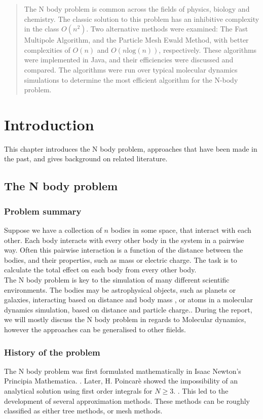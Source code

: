 \documentclass[pdftex,twoside,a4paper]{report}
\begin{document}
\begin{abstract}
The N body problem is common across the fields of physics, biology and chemistry. The classic solution to this problem has an inhibitive complexity in the class $O(n^2)$. Two alternative methods were examined: The Fast Multipole Algorithm, and the Particle Mesh Ewald Method, with better complexities of $O(n)$ and $O(n \text{log}(n))$, respectively. These algorithms were implemented in Java, and their efficiencies were discussed and compared. The algorithms were run over typical molecular dynamics simulations to determine the most efficient algorithm for the N-body problem.
\end{abstract}

\tableofcontents

\chapter{Introduction}
This chapter introduces the N body problem, approaches that have been made in the past, and gives background on related literature.
\section{The N body problem}
    \subsection{Problem summary}
    Suppose we have a collection of $n$ bodies in some space, that interact with each other. Each body interacts with every other body in the system in a pairwise way. Often this pairwise interaction is a function of the distance between the bodies, and their properties, such as mass or electric charge. The task is to calculate the total effect on each body from every other body.\\
    
    The N body problem is key to the simulation of many different scientific environments. The bodies may be astrophysical objects, such as planets or galaxies, interacting based on distance and body mass \cite{MilleniumRun}, or atoms in a molecular dynamics simulation, based on distance and particle charge.\cite{NAMD}. During the report, we will mostly discuss the N body problem in regards to Molecular dynamics, however the approaches can be generalised to other fiields.
    \subsection{History of the problem}
    The N body problem was first formulated mathematically in Isaac Newton's Principia Mathematica. \cite{principia}. Later, H. Poincar\`{e} showed the impossibility of an analytical solution using first order integrals for $N \geq 3$. \cite{poincare}. This led to the development of several approximation methods. These methods can be roughly classified as either tree methods, or mesh methods.\\
    
\end{document}
